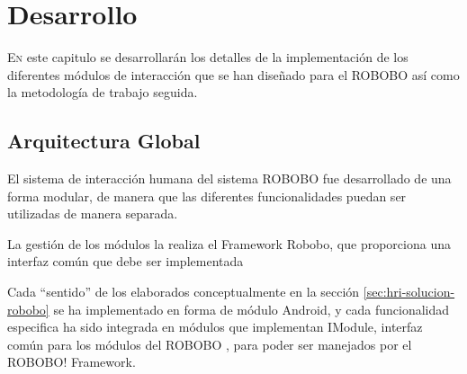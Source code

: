 
\chapter{Desarrollo}
\label{chap:desarrollo}
\vspace{0.5cm}

\lettrine{E}{n} este capitulo se desarrollarán los detalles de la implementación de los diferentes módulos de interacción que se han diseñado para el ROBOBO así como la metodología de trabajo seguida.
\section{Arquitectura Global}
\label{sec:globalArchitecture}
El sistema de interacción humana del sistema ROBOBO fue desarrollado de una forma modular, de manera que las diferentes funcionalidades puedan ser utilizadas de manera separada.

La gestión de los módulos la realiza el Framework Robobo, que proporciona una interfaz común que debe ser implementada


Cada \enquote{sentido} de los elaborados conceptualmente en la sección \ref{sec:hri-solucion-robobo} se ha implementado en forma de módulo Android, y cada funcionalidad especifica ha sido integrada en módulos que implementan IModule, interfaz común para los módulos del ROBOBO , para poder ser manejados por el ROBOBO! Framework\cite{RoboboFramework}.

